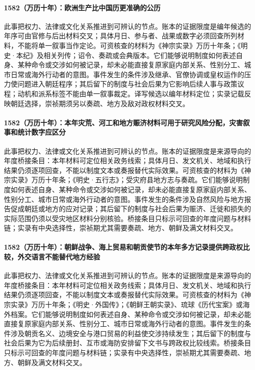 \paragraph{1582（万历十年）：欧洲生产比中国历更准确的公历} 此事把权力、法律或文化关系推进到可辨认的节点。账本的证据限度是编年候选的年序可由官修与后出材料交叉；具体月日、参与者、战果或数字必须回查所列材料，不能将单一叙事当作定论。可资核查的材料为《神宗实录》万历十年条；《明史·本纪》及相关列传；诏令、奏疏或会典版本。它们能够说明制度如何表述自身、某种命令或交涉如何被记录，却未必能直接复原家庭内部关系、性别分工、城市日常或海外行动者的意图。事件发生的条件涉及继承、官僚协调或皇权运作的压力使问题进入朝廷程序；其后留下的制度与社会后果为它影响后续人事与政策议程；动机和派系标签不能由单一叙事裁定。译写候选以编年材料定位；实录记载反映朝廷选择，崇祯期须另以奏疏、地方及敌对政权材料交叉。

\paragraph{1582（万历十年）：本年灾荒、河工和地方赈济材料可用于研究风险分配，灾害叙事和统计数字应区分} 此事把权力、法律或文化关系推进到可辨认的节点。账本的证据限度是来源导向的年度桥接条目：本年材料可定位相关政务线索；具体月日、发文机关、地域和执行结果仍须逐项回查，不能以制度文本或奏报替代实际效果。可资核查的材料为《神宗实录》万历十年条；《明史·五行志》；受灾府县地方志与奏疏。它们能够说明制度如何表述自身、某种命令或交涉如何被记录，却未必能直接复原家庭内部关系、性别分工、城市日常或海外行动者的意图。事件发生的条件涉及自然风险与地方报告促成朝廷或地方的应对记录；其后留下的制度与社会后果为赈济、迁徙和损失的实际范围仍须以受灾地区材料分别核验。桥接条目只标示可回查的年度问题与材料链；实录有中央选择性，崇祯期尤其需要奏疏、地方、朝鲜及满文材料交叉。

\paragraph{1582（万历十年）：朝鲜战争、海上贸易和朝贡使节的本年多方记录提供跨政权比较，外交语言不能替代地方经验} 此事把权力、法律或文化关系推进到可辨认的节点。账本的证据限度是来源导向的年度桥接条目：本年材料可定位相关政务线索；具体月日、发文机关、地域和执行结果仍须逐项回查，不能以制度文本或奏报替代实际效果。可资核查的材料为《神宗实录》万历十年条；《明史·外国传》；《朝鲜王朝实录》、琉球《历代宝案》或海外档案。它们能够说明制度如何表述自身、某种命令或交涉如何被记录，却未必能直接复原家庭内部关系、性别分工、城市日常或海外行动者的意图。事件发生的条件涉及朝贡名义、边境安全与港口贸易的利益使交涉持续发生；其后留下的制度与社会后果为它为后续册封、互市或海防安排留下文书与跨政权比较线索。桥接条目只标示可回查的年度问题与材料链；实录有中央选择性，崇祯期尤其需要奏疏、地方、朝鲜及满文材料交叉。

